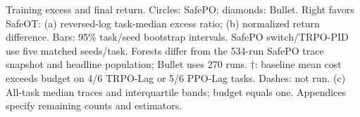 Training excess and final return. Circles: SafePO; diamonds: Bullet. Right favors SafeOT: (a) reversed-log task-median excess ratio; (b) normalized return difference. Bars: 95\% task/seed bootstrap intervals. SafePO switch/TRPO-PID use five matched seeds/task. Forests differ from the 534-run SafePO trace snapshot and headline population; Bullet uses 270 runs. $\dagger$: baseline mean cost exceeds budget on 4/6 TRPO-Lag or 5/6 PPO-Lag tasks. Dashes: not run. (c) All-task median traces and interquartile bands; budget equals one. Appendices specify remaining counts and estimators.
